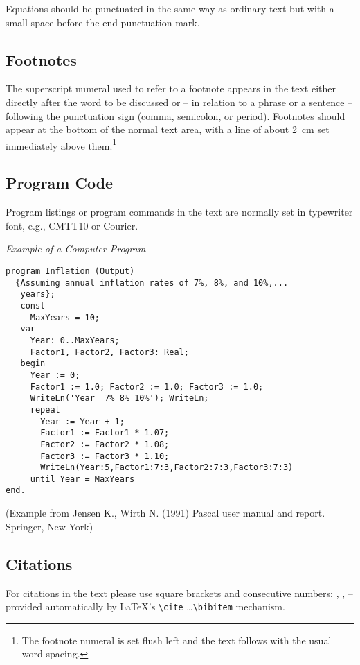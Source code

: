 \documentclass[runningheads]{llncs}
\begin{document}
Equations should be punctuated in the same way as ordinary
text but with a small space before the end punctuation mark.

\subsection{Footnotes}

The superscript numeral used to refer to a footnote appears in the text
either directly after the word to be discussed or -- in relation to a
phrase or a sentence -- following the punctuation sign (comma,
semicolon, or period). Footnotes should appear at the bottom of
the
normal text area, with a line of about 2~cm set
immediately above them.\footnote{The footnote numeral is set flush left
and the text follows with the usual word spacing.}

\subsection{Program Code}

Program listings or program commands in the text are normally set in
typewriter font, e.g., CMTT10 or Courier.

\medskip

\noindent
{\it Example of a Computer Program}
\begin{verbatim}
program Inflation (Output)
  {Assuming annual inflation rates of 7%, 8%, and 10%,...
   years};
   const
     MaxYears = 10;
   var
     Year: 0..MaxYears;
     Factor1, Factor2, Factor3: Real;
   begin
     Year := 0;
     Factor1 := 1.0; Factor2 := 1.0; Factor3 := 1.0;
     WriteLn('Year  7% 8% 10%'); WriteLn;
     repeat
       Year := Year + 1;
       Factor1 := Factor1 * 1.07;
       Factor2 := Factor2 * 1.08;
       Factor3 := Factor3 * 1.10;
       WriteLn(Year:5,Factor1:7:3,Factor2:7:3,Factor3:7:3)
     until Year = MaxYears
end.
\end{verbatim}
%
\noindent
{\small (Example from Jensen K., Wirth N. (1991) Pascal user manual and
report. Springer, New York)}

\subsection{Citations}

For citations in the text please use
square brackets and consecutive numbers: \cite{jour}, \cite{lncschap},
\cite{proceeding1} -- provided automatically
by \LaTeX 's \verb|\cite| \dots\verb|\bibitem| mechanism.
\end{document}
